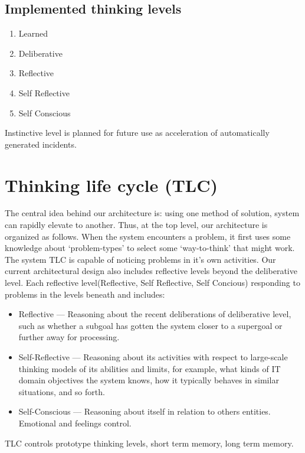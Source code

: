 \documentclass[runningheads,a4paper]{llncs}
\begin{document}
\begin{enumerate}
\subsection{Implemented thinking levels}

\begin{enumerate}
 \item Learned
 \item Deliberative
 \item Reflective
 \item Self Reflective
 \item Self Conscious
\end{enumerate}

Instinctive level is planned for future use as acceleration of automatically generated incidents.

\section{Thinking life cycle (TLC)}

The central idea behind our architecture is: using one method of solution, system can rapidly elevate to another. Thus, at the top level, our architecture is organized as follows. When the system encounters a problem, it first uses some knowledge about ‘problem-types’ to select some ‘way-to-think’ that might work. 
The system TLC is capable of noticing problems in it's own activities. Our current architectural design also includes reflective levels beyond the deliberative level. Each reflective level(Reflective, Self Reflective, Self Concious) responding to problems in the levels beneath and includes:
\begin{itemize}
 \item Reflective — Reasoning about the recent deliberations of deliberative level, such as whether a subgoal has gotten the system closer to a supergoal or further away for processing.
 \item Self-Reflective — Reasoning about its activities with respect to large-scale thinking models of its abilities and limits, for example, what kinds of  IT domain objectives  the system knows, how it typically behaves in similar situations, and so forth.
 \item Self-Conscious — Reasoning about itself in relation to others entities. Emotional and feelings control.
\end{itemize}

TLC controls prototype thinking levels, short term memory, long term memory.


\end{enumerate}
\end{document}

